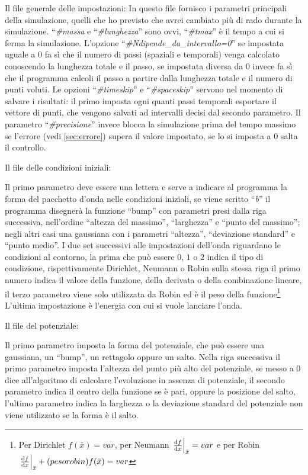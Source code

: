Il file generale delle impostazioni:
\label{lst:settings}
In questo file fornisco i parametri principali della simulazione, quelli che ho previsto che avrei cambiato pi\`u di rado durante la simulazione. ``\textit{\#massa} e ``\textit{\#lunghezza}'' sono ovvi, ``\textit{\#tmax}'' \`e il tempo a cui si ferma la simulazione. L'opzione ``\textit{\#Ndipende\_da\_intervallo=0}'' se impostata uguale a $0$ fa s\`i che il numero di passi (spaziali e temporali) venga calcolato conoscendo la lunghezza totale e il passo, se impostata diversa da $0$ invece fa s\`i che il programma calcoli il passo a partire dalla lunghezza totale e il numero di punti voluti. Le opzioni ``\textit{\#timeskip}'' e ``\textit{\#spaceskip}'' servono nel momento di salvare i risultati: il primo imposta ogni quanti passi temporali esportare il vettore di punti, che vengono salvati ad intervalli decisi dal secondo parametro. Il parametro ``\textit{\#precisione}'' invece blocca la simulazione prima del tempo massimo se l'errore (vedi \autoref{sec:errore}) supera il valore impostato, se lo si imposta a 0 salta il controllo.

Il file delle condizioni iniziali:

Il primo parametro deve essere una lettera e serve a indicare al programma la forma del pacchetto d'onda nelle condizioni iniziali, se viene scritto ``\textit{b}'' il programma disegner\`a la funzione ``bump'' con parametri presi dalla riga successiva, nell'ordine ``altezza del massimo'', ``larghezza'' e ``punto del massimo''; negli altri casi una gaussiana con i parametri ``altezza'', ``deviazione standard'' e ``punto medio''. I due set successivi alle impostazioni dell'onda riguardano le condizioni al contorno, la prima che pu\`o essere $0$, $1$ o $2$ indica il tipo di condizione, rispettivamente Dirichlet, Neumann o Robin sulla stessa riga il primo numero indica il valore della funzione, della derivata o della combinazione lineare, il terzo parametro viene solo utilizzata da Robin ed \`e il peso della funzione\footnote{Per Dirichlet $f(\bar x) = var$, per Neumann $\lr.|{\de{f}x}_{\bar x} = var$ e per Robin $\lr.|{\de{f}x}_{\bar x} + (pesorobin) f(\bar x) = var$}
L'ultima impostazione \`e l'energia con cui si vuole lanciare l'onda.

Il file del potenziale:

Il primo parametro imposta la forma del potenziale, che pu\`o essere una gaussiana, un ``bump'', un rettagolo oppure un salto.
Nella riga successiva il primo parametro imposta l'altezza  del punto pi\`u alto del potenziale, se messo a 0 dice all'algoritmo di calcolare l'evoluzione in assenza di potenziale, il secondo parametro indica il centro della funzione se \`e pari, oppure la posizione del salto, l'ultimo parametro indica la larghezza o la deviazione standard del potenziale non viene utilizzato se la forma \`e il salto.

